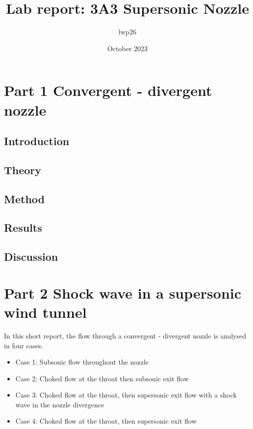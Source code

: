 \documentclass[8pt]{article}
\begin{document}

\title{Lab report: 3A3 Supersonic Nozzle}
\author{lwp26}
\date{October 2023}
\maketitle

\section{Part 1 Convergent - divergent nozzle}

\subsection{Introduction}

\subsection{Theory}

\subsection{Method}

\subsection{Results}

\subsection{Discussion}

\section{Part 2 Shock wave in a supersonic wind tunnel}

In this short report, the flow through a convergent - divergent nozzle is analysed in four cases.

\begin{itemize}
    \item Case 1: Subsonic flow throughout the nozzle
    \item Case 2: Choked flow at the throat then subsonic exit flow
    \item Case 3: Choked flow at the throat, then supersonic exit flow with a shock wave in the nozzle divergence
    \item Case 4: Choked flow at the throat, then supersonic exit flow
\end{itemize}
\end{document}
